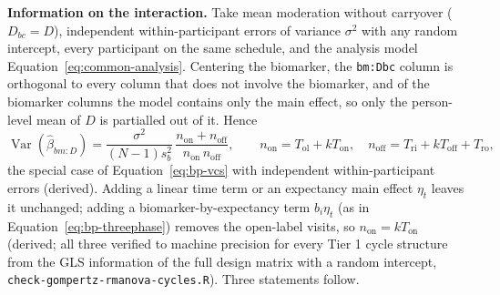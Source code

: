 \documentclass[11pt]{article}
\newcommand{\code}[1]{\texttt{#1}}
\begin{document}
\textbf{Information on the interaction.} Take mean moderation without
carryover ($D_{bc} = D$), independent within-participant errors of
variance $\sigma^2$ with any random intercept, every participant on
the same schedule, and the analysis model
Equation~\eqref{eq:common-analysis}. Centering the biomarker, the
\code{bm:Dbc} column is orthogonal to every column that does not
involve the biomarker, and of the biomarker columns the model contains
only the main effect, so only the person-level mean of $D$ is
partialled out of it. Hence
\begin{equation}
\operatorname{Var}(\hat\beta_{bm:D}) = \frac{\sigma^2}
  {(N-1)s_b^2}\,\frac{n_{\mathrm{on}} + n_{\mathrm{off}}}
  {n_{\mathrm{on}}\, n_{\mathrm{off}}},
  \qquad n_{\mathrm{on}} = T_{\mathrm{ol}} + kT_{\mathrm{on}},
  \quad n_{\mathrm{off}} = T_{\mathrm{ri}} + kT_{\mathrm{off}} +
  T_{\mathrm{ro}},
\label{eq:invb-cycle-var}
\end{equation}
the special case of Equation~\eqref{eq:bp-vcs} with independent
within-participant errors (derived). Adding a linear time term or an
expectancy main effect $\eta_t$ leaves it unchanged; adding a
biomarker-by-expectancy term $b_i\eta_t$ (as in
Equation~\eqref{eq:bp-threephase}) removes the open-label visits, so
$n_{\mathrm{on}} = kT_{\mathrm{on}}$ (derived; all three verified to
machine precision for every Tier 1 cycle structure from the GLS
information of the full design matrix with a random intercept,
\code{check-gompertz-rmanova-cycles.R}). Three statements follow.
\end{document}
